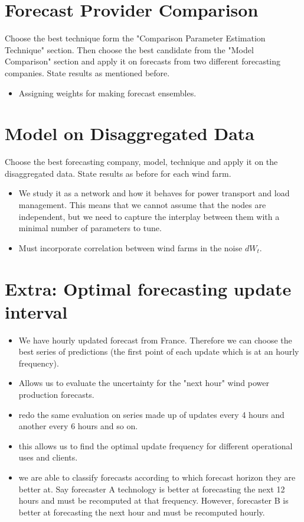 \documentclass[10pt,twocolumn,letterpaper]{article}
\begin{document}
\section{Forecast Provider Comparison}
Choose the best technique form the "Comparison Parameter Estimation Technique" section. Then choose the best candidate from the "Model Comparison" section and apply it on forecasts from two different forecasting companies. State results as mentioned before.

\begin{itemize}
    \item Assigning weights for making forecast ensembles.
\end{itemize}

\section{Model on Disaggregated Data}
Choose the best forecasting company, model, technique and  apply it on the disaggregated data. State results as before for each wind farm.
\begin{itemize}
    \item We study it as a network and how it behaves for power transport and load management. This means that we cannot assume that the nodes are independent, but we need to capture the interplay between them with a minimal number of parameters to tune.
    \item Must incorporate correlation between wind farms in the noise $dW_t$.
\end{itemize}
\section{Extra: Optimal forecasting update interval}
\begin{itemize}
    \item We have hourly updated forecast from France. Therefore we can choose the best series of predictions (the first point of each update which is at an hourly frequency).
    \item  Allows us to evaluate the uncertainty for the "next hour" wind power production forecasts.
    \item redo the same evaluation on series made up of updates every 4 hours and another every 6 hours and so on.
    \item this allows us to find the optimal update frequency for different operational uses and clients.
    \item we are able to classify forecasts according to which forecast horizon they are better at. Say forecaster A technology is better at forecasting the next 12 hours and must be recomputed at that frequency. However, forecaster B is better at forecasting the next hour and must be recomputed hourly.
\end{itemize}
\end{document}
